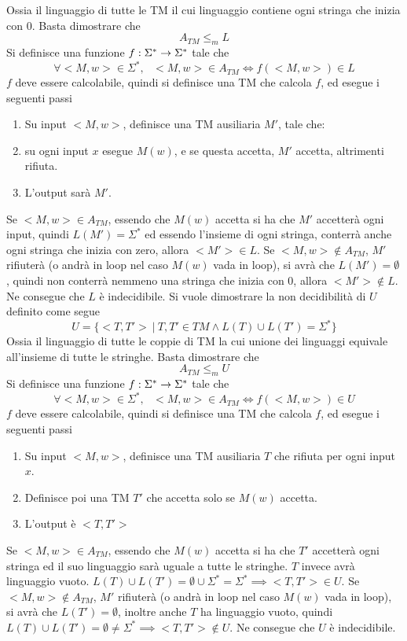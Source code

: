 \documentclass[10pt, letterpaper]{report}
\begin{document}
Ossia il linguaggio di tutte le TM il cui linguaggio contiene ogni stringa che inizia con 0.
Basta dimostrare che $$ A_{TM}\le_m  L$$Si definisce una funzione ${f:\Sigma^*\rightarrow \Sigma^*}$ tale che 
$$ \forall <M,w>\in\Sigma^*, \ \ \  <M,w>\in A_{TM}\iff f( <M,w>)\in L$$
$f$ deve essere calcolabile, quindi si definisce una TM che calcola $f$, ed esegue i seguenti passi 
\begin{enumerate}
    \item  Su input $<M,w>$, definisce una TM ausiliaria $M'$, tale che:
    \item su ogni input $x$ esegue $M(w)$, e se questa accetta, $M'$ accetta, altrimenti rifiuta.
    \item L'output sarà $M'$.
\end{enumerate}
\boxedMath{$\implies$} Se $<M,w>\in A_{TM}$, essendo che $M(w)$ accetta si ha che 
$M'$ accetterà ogni input, quindi $L(M')=\Sigma^*$ ed essendo l'insieme di ogni stringa, conterrà anche ogni stringa che inizia con zero, allora $<M'>\in L$.
\acc \boxedMath{$\impliedby$} Se $<M,w>\notin A_{TM}$, $M'$ rifiuterà  (o andrà in loop nel caso $M(w)$ vada in loop), si avrà che 
$L(M')=\emptyset$, quindi non conterrà nemmeno una stringa che inizia con 0, allora  $<M'>\notin L$.
Ne consegue che $L$ è indecidibile.
Si vuole dimostrare la non decidibilità di $U$ definito come segue 
$$ U=\{<T,T'> \ | \ T,T'\in TM\land L(T)\cup L(T')=\Sigma^*\}$$ 
Ossia il linguaggio di tutte le coppie di TM la cui unione dei linguaggi equivale all'insieme di tutte le stringhe.
Basta dimostrare che $$ A_{TM}\le_m  U$$Si definisce una funzione ${f:\Sigma^*\rightarrow \Sigma^*}$ tale che 
$$ \forall <M,w>\in\Sigma^*, \ \ \  <M,w>\in A_{TM}\iff f( <M,w>)\in U$$
$f$ deve essere calcolabile, quindi si definisce una TM che calcola $f$, ed esegue i seguenti passi 
\begin{enumerate}
    \item  Su input $<M,w>$, definisce una TM ausiliaria $T$ che rifiuta per ogni input $x$. 
    \item Definisce poi una TM $T'$ che accetta solo se $M(w)$ accetta. 
    \item L'output è $<T,T'>$
\end{enumerate}
\boxedMath{$\implies$} Se $<M,w>\in A_{TM}$, essendo che $M(w)$ accetta si ha che
$T'$ accetterà ogni stringa ed il suo linguaggio sarà uguale a tutte le stringhe. $T$ invece avrà linguaggio vuoto. $L(T)\cup L(T')=\emptyset\cup \Sigma^*=\Sigma^*\implies <T,T'>\in U$.
\acc \boxedMath{$\impliedby$} Se $<M,w>\notin A_{TM}$, $M'$ rifiuterà  (o andrà in loop nel caso $M(w)$ vada in loop), si avrà che 
$L(T')=\emptyset$, inoltre anche $T$ ha linguaggio vuoto, quindi $L(T)\cup L(T')=\emptyset\ne \Sigma^*\implies <T,T'>\notin U$. Ne consegue che $U$ è indecidibile.
\flowerLine
\end{document}
